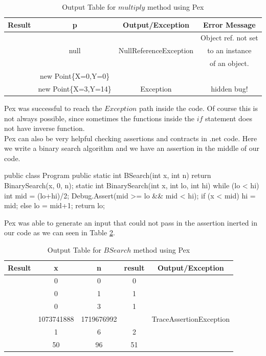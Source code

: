 \documentclass[10pt, conference, compsocconf]{IEEEtran}
\newcommand{\checkK}{\color{ForestGreen}\checkmark}
\newcommand{\cross}{\color{red}\hspace{-3pt}\ding{55}}
\begin{document}
\begin{table}[!ht]
\renewcommand{\arraystretch}{1.3}
\setlength{\tabcolsep}{1pt}
\caption{Output Table for $multiply$ method using Pex}
\label{tab:point}
\centering
\noindent \begin{tabular}{|c|c|c|c|}\hline
Result & p & Output/Exception & Error Message\\\hline
 &  &  & Object ref. not set \\
\cross & null  & NullReferenceException & to an instance \\
 &  &  & of an object.\\\hline
\checkK & new Point\{X=0,Y=0\} & &\\\hline
\cross & new Point\{X=3,Y=14\} & Exception & hidden bug!\\\hline
\end{tabular}
\end{table}

Pex was successful to reach the $Exception$ path inside the code. Of course this is not always possible, since sometimes the functions inside
the $if$ statement does not have inverse function.\\

Pex can also be very helpful checking assertions and contracts in .net code. Here we write a binary search algorithm and we have an assertion in
the middle of our code.

\begin{code}
public class Program {
  public static int BSearch(int x, int n) {
    return BinarySearch(x, 0, n);
  }
  static int BinarySearch(int x, int lo, int hi) {
    while (lo < hi) {
      int mid = (lo+hi)/2;
      Debug.Assert(mid >= lo && mid < hi);
      if (x < mid) { hi = mid; } else { lo = mid+1; }
    }
    return lo;
  }
}
\end{code}

Pex was able to generate an input that could not pass in the assertion inerted in our code as we can seen in Table \ref{tab:binary}.

\begin{table}[!ht]
\renewcommand{\arraystretch}{1.3}
\setlength{\tabcolsep}{1pt}
\caption{Output Table for $BSearch$ method using Pex}
\label{tab:binary}
\centering
\noindent \begin{tabular}{|c|c|c|c|c|}\hline
Result & x & n & result & Output/Exception \\\hline
\checkK & 0 & 0 & 0      & \\\hline
\checkK & 0 & 1 & 1      & \\\hline
\checkK & 0 & 3 & 1      & \\\hline
\cross & 1073741888 & 1719676992 & & TraceAssertionException \\\hline
\checkK & 1 & 6 & 2      & \\\hline
\checkK & 50 & 96 & 51      &\\\hline
\end{tabular}
\end{table}
\end{document}
